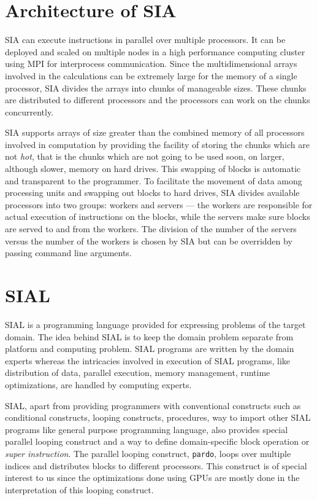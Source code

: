 \section{Architecture of SIA}\label{siaarch}
SIA can execute instructions in parallel over multiple processors. It can be
deployed and scaled on multiple nodes in a high performance computing cluster
using MPI for interprocess communication. Since the
multidimensional arrays involved in the calculations can be extremely large for
the memory of a single processor, SIA divides the arrays into chunks of
manageable sizes. These chunks are distributed to different processors and the
processors can work on the chunks concurrently.

SIA supports arrays of size greater than the combined memory of all processors
involved in computation by providing the facility of storing the chunks which are
not \textit{hot}, that is the chunks which are not going to be used soon, on
larger, although slower, memory on hard drives. This swapping of blocks is automatic
and transparent to the programmer. To facilitate the movement of data among
processing units and swapping out blocks to hard drives, SIA divides available
processors into two groups: workers and servers --- the workers are responsible for
actual execution of instructions on the blocks, while the servers make sure blocks
are served to and from the workers. The division of the number of the servers versus the number
of the workers is chosen by SIA but can be overridden by passing command line
arguments.

\section{SIAL}
SIAL is a programming language provided for expressing problems of the target
domain. The idea behind SIAL is to keep the domain problem separate from
platform and computing problem. SIAL programs are written by the domain experts
whereas the intricacies involved in execution of SIAL programs, like distribution of
data, parallel execution, memory management, runtime optimizations, are handled
by computing experts.

SIAL, apart from providing programmers with conventional constructs such as
conditional constructs, looping constructs, procedures, way to import other SIAL
programs like general purpose programming language, also provides special parallel looping construct and a way
to define domain-specific block operation or \textit{super instruction}. The
parallel looping construct, \texttt{pardo}, loops over multiple indices and
distributes blocks to different processors. This construct is of special
interest to us since the optimizations done using GPUs are mostly done in the
interpretation of this looping construct.

